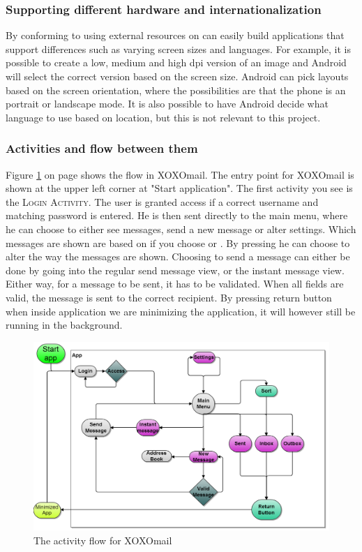 \subsubsection{Supporting different hardware and internationalization}
By conforming to using external resources on can easily build applications that support differences such as varying screen sizes and languages. For example, it is possible to create a low, medium and high \gls{dpi} version of an image and Android will select the correct version based on the screen size. Android can pick layouts based on the screen orientation, where the possibilities are that the phone is an portrait or landscape mode. It is also possible to have Android decide what language to use based on location, but this is not relevant to this project. 




\subsubsection{Activities and flow between them}

Figure \ref{fig:logicalGUIview} on page \pageref{fig:logicalGUIview} shows the flow in XOXOmail. The entry point for XOXOmail is shown at the upper left corner at "Start application". The first activity you see is the \textsc{Login Activity}. The user is granted access if a correct username and matching password is entered. He is then sent directly to the main menu, where he can choose to either see messages, send a new message or alter settings. Which messages are shown are based on if you choose  or . By pressing  he can choose to alter the way the messages are shown. Choosing to send a message can either be done by going into the regular send message view, or the instant message view. Either way, for a message to be sent, it has to be validated. When all fields are valid, the message is sent to the correct recipient. By pressing return button when inside application we are minimizing the application, it will however still be running in the background.

\begin{figure}[h!]
	\includegraphics[width=\textwidth]{activities_flowchart3}
	\caption{The activity flow for XOXOmail}
	\label{fig:logicalGUIview}
\end{figure}



